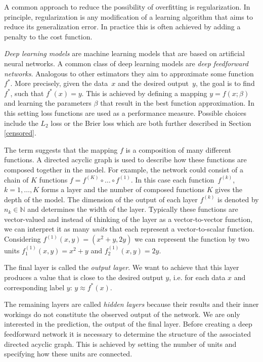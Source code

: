 \documentclass[12pt, a4paper]{scrartcl}
\theoremstyle{definition}
\theoremstyle{plain}
\numberwithin{equation}{section}
\numberwithin{figure}{section}
\numberwithin{table}{section}
\begin{document}
	A common approach to reduce the possibility of overfitting is regularization.
	In principle, regularization is any modification of a learning algorithm that aims to reduce its generalization error.
	In practice this is often achieved by adding a penalty to the cost function.
	
	\emph{Deep learning models} are machine learning models that are based on artificial neural networks.
	A common class of deep learning models are \emph{deep feedforward networks}. Analogous to other estimators they aim to approximate some function~$f^*$.
	More precisely, given the data~$x$ and the desired output~$y$, the goal is to find $f^*$, such that $f^*(x)=y$.
	This is achieved by defining a mapping $y = f(x; \beta)$ and learning the parameters $\beta$ that result in the best function approximation.
	In this setting loss functions are used as a performance measure.
	Possible choices include the $L_2$ loss or the Brier loss which are both further described in Section \ref{censored}.
	
	The term  suggests that the mapping $f$ is a composition of many different functions.
	A directed acyclic graph is used to describe how these functions are composed together in the model.
	For example, the network could consist of a chain of $K$ functions $ f = f^{(K)}\circ \dots \circ f^{(1)}$.
	In this case each function~$f^{(k)}$, $k=1,\dots,K$ forms a layer and the number of composed functions $K$ gives the depth of the model.
	The dimension of the output of each layer $f^{(k)}$ is denoted by $n_k\in \mathbb{N}$ and determines the width of the layer.
	Typically these functions are vector-valued and instead of thinking of the layer as a vector-to-vector function, we can interpret it as many \emph{units} that each represent a vector-to-scalar function.
	Considering $f^{(1)}(x,y)= (x^2+y,2y)$ we can represent the function by two units $f^{(1)}_1 (x,y) = x^2+y$ and $f^{(1)}_2(x,y) = 2y$.
	
	The final layer is called the \emph{output layer}.
	We want to achieve that this layer produces a value that is close to the desired output $y$, i.e. for each data $x$ and corresponding label $y$: $y \approx f^*(x)$.
	
	The remaining layers are called \emph{hidden layers} because their results and their inner workings do not constitute the observed output of the network.
	We are only interested in the prediction, the output of the final layer.
	Before creating a deep feedforward network it is necessary to determine the structure of the associated directed acyclic graph.
	This is achieved by setting the number of units and specifying how these units are connected.
	
\end{document}
